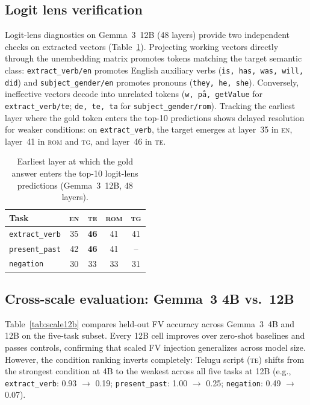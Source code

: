 \documentclass[11pt]{article}
\newcommand{\cond}[1]{\textsc{#1}}
\begin{document}
\subsection{Logit lens verification}
\label{sec:logitlens}

Logit-lens diagnostics \cite{nostalgebraist2020logitlens} on Gemma~3~12B (48
layers) provide two independent checks on extracted vectors
(Table~\ref{tab:logitlens}). Projecting working vectors directly through the
unembedding matrix promotes tokens matching the target semantic class:
\texttt{extract\_verb/en} promotes English auxiliary verbs
(\texttt{is, has, was, will, did}) and \texttt{subject\_gender/en} promotes
pronouns (\texttt{they, he, she}). Conversely, ineffective vectors decode into
unrelated tokens (\texttt{w, p\aa, getValue} for \texttt{extract\_verb/te};
\texttt{de, te, ta} for \texttt{subject\_gender/rom}). Tracking the earliest
layer where the gold token enters the top-10 predictions shows delayed
resolution for weaker conditions: on \texttt{extract\_verb}, the target emerges
at layer~35 in \cond{en}, layer~41 in \cond{rom} and \cond{tg}, and layer~46 in
\cond{te}.

\begin{table}[t]
\centering
\small
\begin{tabular}{lcccc}
\toprule
Task & \cond{en} & \cond{te} & \cond{rom} & \cond{tg} \\
\midrule
\texttt{extract\_verb} & 35 & \textbf{46} & 41 & 41 \\
\texttt{present\_past} & 42 & \textbf{46} & 41 & -- \\
\texttt{negation}      & 30 & 33 & 33 & 31 \\
\bottomrule
\end{tabular}
\caption{Earliest layer at which the gold answer enters the top-10 logit-lens
  predictions (Gemma~3~12B, 48 layers).}
\label{tab:logitlens}
\end{table}

\subsection{Cross-scale evaluation: Gemma~3 4B vs.\ 12B}
\label{sec:12b}

Table~\ref{tab:scale12b} compares held-out FV accuracy across Gemma~3~4B and
12B on the five-task subset. Every 12B cell improves over zero-shot baselines
and passes controls, confirming that scaled FV injection generalizes across
model size. However, the condition ranking inverts completely: Telugu script
(\cond{te}) shifts from the strongest condition at 4B to the weakest across all
five tasks at 12B (e.g., \texttt{extract\_verb}: 0.93 $\to$ 0.19;
\texttt{present\_past}: 1.00 $\to$ 0.25; \texttt{negation}: 0.49 $\to$ 0.07).
\end{document}
